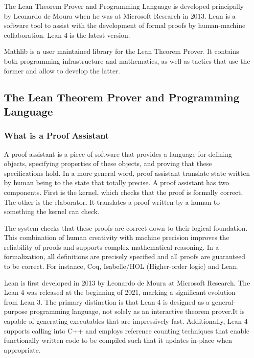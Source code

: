 The Lean Theorem Prover and Programming Language is developed principally by Leonardo de Moura when he was at Microsoft Research in 2013. Lean is a software tool to assist with the development of formal proofs by human-machine collaboration. Lean 4 is the latest version.

Mathlib is a user maintained library for the Lean Theorem Prover. It contains both programming infrastructure and mathematics, as well as tactics that use the former and allow to develop the latter.


\subsection{The Lean Theorem Prover and Programming Language}
\subsubsection{What is a Proof Assistant}
A proof assistant is a piece of software that provides a language for defining objects, specifying properties of these objects, and proving that these specifications hold. In a more general word, proof assistant translate state written by human being to the state that totally precise. A proof assistant has two components. First is the kernel, which checks that the proof is formally correct. The other is the elaborator. It translates a proof written by a human to something the kernel can check.

The system checks that these proofs are correct down to their logical foundation. This combination of human creativity with machine precision improves the reliability of proofs and supports complex mathematical reasoning. In a formalization, all definitions are precisely specified and all proofs are guaranteed to be correct. For instance, Coq, Isabelle/HOL (Higher-order logic) and Lean.

Lean is first developed in 2013 by Leonardo de Moura at Microsoft Research. The Lean 4 was released at the beginning of 2021, marking a significant evolution from  Lean 3. The primary distinction is that Lean 4 is designed as a general-purpose programming language, not solely as an interactive theorem prover.It is capable of generating executables that are impressively fast. Additionally, Lean 4 supports calling into C++ and employs reference counting techniques that enable functionally written code to be compiled such that it updates in-place when appropriate.


